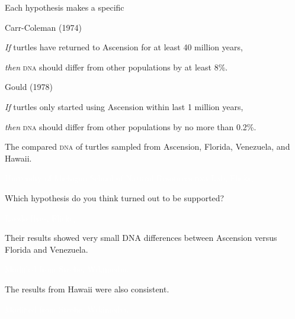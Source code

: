 \documentclass[t,handout]{beamer}  %
\begin{document}
\begin{frame}[t]{Each hypothesis makes a specific }
	\vspace*{-\baselineskip}


	\setlength{\columnseprule}{0.4pt}

	\begin{multicols}{2}
	
		\hangpara Carr-Coleman (1974)
	
		\hangpara \textit{If} turtles have returned to Ascension for at least 40 million years,
	
		\hangpara \textit{then} \textsc{dna} should differ from other populations by at least 8\%.
	
	\columnbreak
	
		\hangpara Gould (1978)
	
		\hangpara \textit{If} turtles only started using Ascension within last 1 million years,
	
		\hangpara \textit{then} \textsc{dna} should differ from other populations by no more than 0.2\%.	
	\end{multicols}
\end{frame}

{
\begin{frame}[b]{The  compared \textsc{dna} of turtles sampled from Ascension, Florida, Venezuela, and Hawaii.}

\tiny\textcolor{white}{University of Michigan School of Natural Resources \textsc{dna} Lab, Flickr, }
\end{frame}
}

{
\begin{frame}[b,plain]{Which hypothesis do you think turned out to be supported?}

\hfill\tiny\textcolor{white}{Laszlo Ilyes, Flickr, .}
\end{frame}
}

{
\begin{frame}[b]{Their results showed very small DNA differences between Ascension versus Florida and Venezuela.}
	
\hfill\tiny\textcolor{white}{Modified from Strebe, Wikimedia, }
\end{frame}
}
{
\begin{frame}[b]{The results from Hawaii were also consistent.}
	
\hfill\tiny\textcolor{white}{Modified from Strebe, Wikimedia, }
\end{frame}
}
\end{document}
